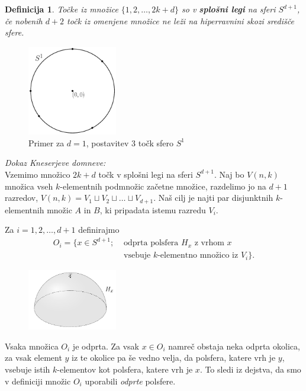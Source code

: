\documentclass[a4paper,12pt]{article}
\newtheorem{definicija}{Definicija}
\begin{document}
\begin{definicija}
Točke iz množice $\{1,2,\ldots,2k+d\}$ so v \textbf {splošni legi} na sferi $S^{d+1}$, če nobenih $d+2$ točk iz omenjene množice ne leži na hiperravnini skozi središče sfere.
\end{definicija}

\begin{figure}[h!]
\centering
\includegraphics[width=0.35\textwidth]{splosna_lega}
\caption{Primer za $d=1$, postavitev $3$ točk sfero $S^1$}
\end{figure}


\noindent
{\em Dokaz Kneserjeve domneve:}\\
\indent Vzemimo množico $2k+d$ točk v splošni legi na sferi $S^{d+1}$. Naj bo $V(n,k)$ množica vseh $k$-elementnih podmnožic začetne množice, razdelimo jo na $d+1$ razredov, $V(n,k) = V_1 \sqcup V_2 \sqcup \ldots \sqcup V_{d+1}$. Naš cilj je najti par disjunktnih $k$-elementnih množic $A$ in $B$, ki pripadata istemu razredu $V_i$.
\newpage


Za $i=1, 2,\ldots, d+1$ definirajmo
\begin{align*} O_i = \{x \in S^{d+1}; &\text{ odprta polsfera } H_x \text{ z vrhom } x \\ &\text{ vsebuje } k\text{-elementno množico iz } V_i\}.
\end{align*}

\begin{figure}[h]
\centering
\includegraphics[width=0.35\textwidth]{polsfera}
\end{figure}


Vsaka množica $O_i$ je odprta. Za vsak $x \in O_i$ namreč obstaja neka odprta okolica, za vsak element $y$ iz te okolice pa še vedno velja, da polsfera, katere vrh je $y$, vsebuje istih $k$-elementov kot polsfera, katere vrh je $x$. To sledi iz dejstva, da smo v definiciji množic $O_i$ uporabili {\em odprte} polsfere.
\end{document}
